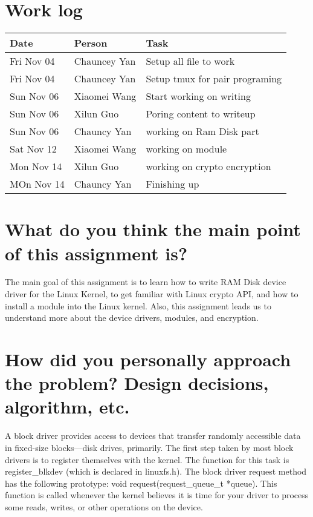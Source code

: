 \documentclass[10pt,draftclsnofoot,onecolumn,journal,compsoc]{IEEEtran}
\begin{document}
\section{Work log}
\begin{tabular}{ | l | l | l |}
    \hline
     Date & Person & Task \\ \hline
     Fri Nov 04 & Chauncey Yan & Setup all file to work \\ \hline
     Fri Nov 04 & Chauncey Yan & Setup tmux for pair programing   \\ \hline
     Sun Nov 06 & Xiaomei Wang & Start working on writing \\ \hline
     Sun Nov 06 & Xilun Guo    & Poring content to writeup \\ \hline
     Sun Nov 06 & Chauncy Yan  & working on Ram Disk part \\ \hline
     Sat Nov 12 & Xiaomei Wang & working on module \\ \hline 
     Mon Nov 14 & Xilun Guo    & working on crypto encryption \\ \hline
     MOn Nov 14 & Chauncy Yan  & Finishing up \\ \hline  
\end{tabular}


\section{What do you think the main point of this assignment is?}
The main goal of this assignment is to learn how to write RAM Disk device driver for the Linux Kernel, to get familiar with Linux crypto API, and how to install a module into the Linux kernel. Also, this assignment leads us to understand more about the device drivers, modules, and encryption.

\section{How did you personally approach the problem? Design decisions, algorithm, etc.}
A block driver provides access to devices that transfer randomly accessible data in fixed-size blocks—disk drives, primarily. The first step taken by most block drivers is to register themselves with the kernel. The function for this task is register\_blkdev (which is declared in linux\/fs.h). The block driver request method has the following prototype: void request(request\_queue\_t *queue). This function is called whenever the kernel believes it is time for your driver to process some reads, writes, or other operations on the device.
\end{document}
